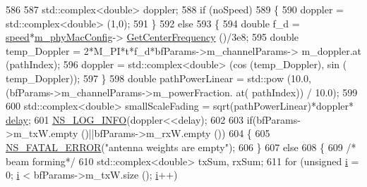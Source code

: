\begin{DoxyCode}
586 
587                                 std::complex<double> doppler;
588                                 \textcolor{keywordflow}{if} (noSpeed)
589                                 \{
590                                         doppler = std::complex<double> (1,0);
591                                 \}
592                                 \textcolor{keywordflow}{else}
593                                 \{
594                                         \textcolor{keywordtype}{double} f\_d = \hyperlink{mmwave-amc-test_8cc_a6dc6e6f3c75c509ce943163afb5dade7}{speed}*\hyperlink{classns3_1_1MmWaveChannelRaytracing_a7782dd5b891e4cffae9024b271960891}{m\_phyMacConfig}->
      \hyperlink{classns3_1_1MmWavePhyMacCommon_a0850d2e37c7075b9bce242723b722019}{GetCenterFrequency} ()/3e8;
595                                         \textcolor{keywordtype}{double} temp\_Doppler = 2*M\_PI*t*f\_d*bfParams->m\_channelParams->
      m\_doppler.at (pathIndex);
596                                         doppler = std::complex<double> (cos (temp\_Doppler), sin (
      temp\_Doppler));
597                                 \}
598                 \textcolor{keywordtype}{double} pathPowerLinear = std::pow (10.0, (bfParams->m\_channelParams->m\_powerFraction. at(
      pathIndex)) / 10.0);
599 
600                                 std::complex<double> smallScaleFading = sqrt(pathPowerLinear)*doppler*
      \hyperlink{lte_2model_2fading-traces_2fading__trace__generator_8m_a7964e6aa8f61a9d28973c8267a606ad8}{delay};
601                                 \hyperlink{group__logging_gafbd73ee2cf9f26b319f49086d8e860fb}{NS\_LOG\_INFO}(doppler<<delay);
602 
603                                 \textcolor{keywordflow}{if}(bfParams->m\_txW.empty ()||bfParams->m\_rxW.empty ())
604                                 \{
605                                         \hyperlink{group__fatal_ga5131d5e3f75d7d4cbfd706ac456fdc85}{NS\_FATAL\_ERROR}(\textcolor{stringliteral}{"antenna weights are empty"});
606                                 \}
607                                 \textcolor{keywordflow}{else}
608                                 \{
609                                         \textcolor{comment}{/* beam forming*/}
610                                         std::complex<double> txSum, rxSum;
611                                         \textcolor{keywordflow}{for} (\textcolor{keywordtype}{unsigned} \hyperlink{bernuolliDistribution_8m_a6f6ccfcf58b31cb6412107d9d5281426}{i} = 0; \hyperlink{bernuolliDistribution_8m_a6f6ccfcf58b31cb6412107d9d5281426}{i} < bfParams->m\_txW.size (); 
      \hyperlink{bernuolliDistribution_8m_a6f6ccfcf58b31cb6412107d9d5281426}{i}++)

\end{DoxyCode}
